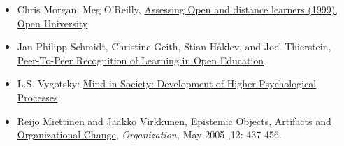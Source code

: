 \begin{itemize}
\item
  Chris Morgan, Meg O'Reilly,
  \href{http://books.google.com/books/about/Assessing\_Open\_and\_Distance\_Learners.html?id=wZcihyWRdIIC}{Assessing
  Open and distance learners (1999), Open University}
\item
  Jan Philipp Schmidt, Christine Geith, Stian Håklev, and Joel
  Thierstein,
  \href{http://www.irrodl.org/index.php/irrodl/article/view/641/1389}{Peer-To-Peer
  Recognition of Learning in Open Education}
\item
  L.S. Vygotsky:
  \href{http://books.google.com/books?id=RxjjUefze\_oC\&printsec=frontcover\&source=gbs\_atb\#v=onepage\&q\&f=false}{Mind
  in Society: Development of Higher Psychological Processes}
\item
  \href{http://org.sagepub.com/search?author1=Reijo+Miettinen\&sortspec=date\&submit=Submit}{Reijo
  Miettinen} and
  \href{http://org.sagepub.com/search?author1=Jaakko+Virkkunen\&sortspec=date\&submit=Submit}{Jaakko
  Virkkunen},
  \href{http://org.sagepub.com/content/12/3/437.abstract}{Epistemic
  Objects, Artifacts and Organizational Change}, \emph{Organization,}
  May 2005 ,12: 437-456.
\end{itemize}

